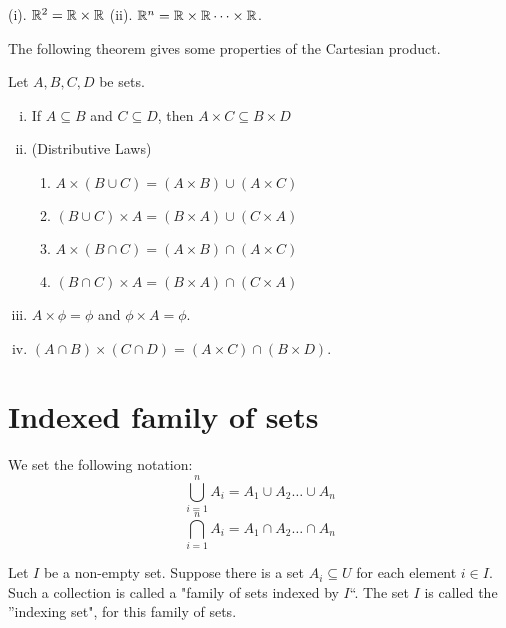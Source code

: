\documentclass[a4paper,english,12pt]{article}
\begin{document}
\begin{exmp}
(i). $\mathbb{R}^{2} = \mathbb{R} \times \mathbb{R}$ (ii). $\mathbb{R}^{n} = \mathbb{R} \times \mathbb{R} \dots \times \mathbb{R}$.
\end{exmp}

The following theorem gives some properties of the Cartesian product.
\begin{thm}
 Let $A, B, C, D$ be sets.
 \begin{enumerate}[i)]
  \item If $A \subseteq B$ and $C \subseteq D$, then $A \times C \subseteq B \times D$
  \item (Distributive Laws)
  \begin{enumerate}
   \item $A \times (B \cup C) = (A \times B) \cup (A \times C)$ 
   \item $(B \cup C) \times A = (B \times A) \cup (C \times A)$
   \item $A \times (B \cap C) = (A \times B) \cap (A \times C)$
   \item $(B \cap C) \times A = (B \times A) \cap (C \times A)$
  \end{enumerate}
  \item $A \times \phi = \phi$ and $\phi \times A = \phi$.
  \item $(A \cap B) \times (C \cap D) = (A \times C) \cap (B \times D)$.
\end{enumerate}

\end{thm}

\section{Indexed family of sets}
We set the following notation:
\begin{equation*}
 \bigcup_{i = 1}^{n} A_{i} = A_{1} \cup A_{2} \dots \cup A_{n}
 \nonumber
\end{equation*}
\begin{equation*}
 \bigcap_{i = 1}^{n} A_{i} = A_{1} \cap A_{2} \dots \cap A_{n}
 \nonumber
\end{equation*}

\begin{defn}
 Let $I$ be a non-empty set. Suppose there is a set $A_{i} \subseteq U$ for each element $i \in I$. Such a collection is called a 
 "family of sets indexed by $I$``. The set $I$ is called the ''indexing set", for this family of sets. 
\end{defn}
\end{document}
